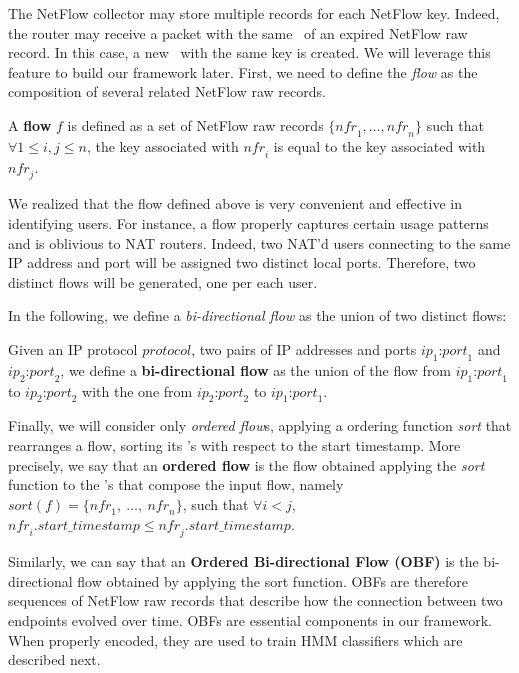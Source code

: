 \documentclass[10pt,conference,compsocconf,letterpaper]{IEEEtran}
\begin{document}
The NetFlow collector may store multiple records for each 
NetFlow key. Indeed, the router may receive a packet with 
the same \fkey\  of an expired NetFlow raw record. In this case, a new 
 \nfr\ with the same key is created.
We will leverage this feature to build our framework later. First, we need
to define the  \emph{flow} as the composition of several related NetFlow 
raw records.
\begin{definition}
\label{def:flow}
  A \textbf{flow} $f$ is defined as a set of NetFlow raw records
  $\{\textit{nfr}_1, \ldots, \textit{nfr}_n\}$ such that $\forall
  1\leq i,j\leq n$, the key associated with $\textit{nfr}_i$ is equal to the key associated with $\textit{nfr}_j$.
\end{definition}
We realized that the flow defined above is very convenient and effective in identifying 
users. For instance, a flow properly captures certain usage patterns and is 
oblivious to NAT routers. Indeed, two NAT'd users connecting to the
same IP address and port will be assigned two distinct local ports. Therefore, 
two distinct flows will be generated, one per each user.  
 


In the following, we define a \emph{bi-directional flow} as
the union of two distinct flows:
\begin{definition}
  Given an IP protocol $\textit{protocol}$, two pairs of IP addresses
  and ports $\textit{ip}_1\textit{:port}_1$ and
  $\textit{ip}_2\textit{:port}_2$, we define a \textbf{bi-directional
    flow} as the union of the flow from
  $\textit{ip}_1\textit{:port}_1$ to $\textit{ip}_2\textit{:port}_2$
  with the one from $\textit{ip}_2\textit{:port}_2$ to
  $\textit{ip}_1\textit{:port}_1$.
\end{definition}
Finally, we will consider only \emph{ordered flow}s, applying a
ordering function \textit{sort} that rearranges a flow, sorting its
\nfr's with respect to the start timestamp. More precisely, we
say that an \textbf{ordered flow} is the flow obtained applying the
\textit{sort} function to the \nfr's that compose the input flow,
namely $\textit{sort}(f)=\{\textit{nfr}_1,\ \ldots,\
\textit{nfr}_n\}$, such that $\forall i<j$,
$\textit{nfr}_i.\textit{start\_timestamp}\leq\textit{nfr}_j.\textit{start\_timestamp}$.

Similarly, we can say that an \textbf{Ordered Bi-directional Flow
  (OBF)} is the bi-directional flow obtained by applying the sort function.
OBFs are therefore sequences of NetFlow raw records 
that describe how the connection between two endpoints evolved over time.
OBFs are essential components in our framework. When properly encoded,
they are used to train HMM classifiers which are described next.
\end{document}
